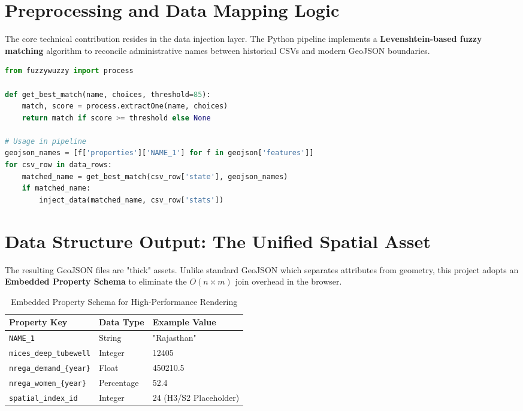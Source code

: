\documentclass[12pt,a4paper]{report}
\begin{document}
\begin{spacing}{1.5}
\section{Preprocessing and Data Mapping Logic}
The core technical contribution resides in the data injection layer. The Python pipeline implements a \textbf{Levenshtein-based fuzzy matching} algorithm to reconcile administrative names between historical CSVs and modern GeoJSON boundaries.

\begin{lstlisting}[language=python, caption={Fuzzy Matching Algorithm for Administrative Boundaries}]
from fuzzywuzzy import process

def get_best_match(name, choices, threshold=85):
    match, score = process.extractOne(name, choices)
    return match if score >= threshold else None

# Usage in pipeline
geojson_names = [f['properties']['NAME_1'] for f in geojson['features']]
for csv_row in data_rows:
    matched_name = get_best_match(csv_row['state'], geojson_names)
    if matched_name:
        inject_data(matched_name, csv_row['stats'])
\end{lstlisting}

\section{Data Structure Output: The Unified Spatial Asset}
The resulting GeoJSON files are "thick" assets. Unlike standard GeoJSON which separates attributes from geometry, this project adopts an \textbf{Embedded Property Schema} to eliminate the $O(n \times m)$ join overhead in the browser.

\begin{table}[H]
\centering
\begin{tabular}{@{}lll@{}}
\toprule
\textbf{Property Key} & \textbf{Data Type} & \textbf{Example Value} \\ \midrule
\texttt{NAME\_1} & String & "Rajasthan" \\
\texttt{mices\_deep\_tubewell} & Integer & 12405 \\
\texttt{nrega\_demand\_\{year\}} & Float & 450210.5 \\
\texttt{nrega\_women\_\{year\}} & Percentage & 52.4 \\
\texttt{spatial\_index\_id} & Integer & 24 (H3/S2 Placeholder) \\ \bottomrule
\end{tabular}
\caption{Embedded Property Schema for High-Performance Rendering}
\end{table}


\end{spacing}
\end{document}
